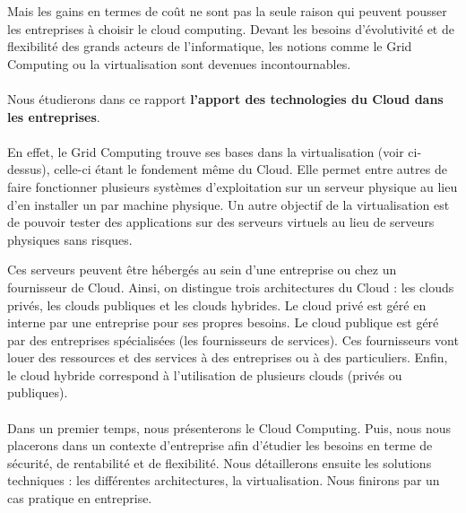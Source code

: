 \documentclass[a4paper,12pt]{report}
\begin{document}
\begin{onehalfspace}
	Mais les gains en termes de coût ne sont pas la seule raison qui peuvent pousser les entreprises à choisir le cloud computing. Devant les besoins d'évolutivité et de flexibilité des grands acteurs de l'informatique, les notions comme le Grid Computing ou la virtualisation sont devenues incontournables.
	
	
	\paragraph*{}
	Nous étudierons dans ce rapport \textbf{l’apport des technologies du Cloud dans les entreprises}.
	
	\paragraph*{}
	En effet, le Grid Computing trouve ses bases dans la virtualisation (voir ci-dessus), celle-ci étant  le fondement même du Cloud. Elle permet entre autres de faire fonctionner plusieurs systèmes d’exploitation sur un serveur physique au lieu d’en installer un par machine physique. Un autre objectif de la virtualisation est de pouvoir tester des applications sur des serveurs virtuels au lieu de serveurs physiques sans risques.
	
	Ces serveurs peuvent être hébergés au sein d’une entreprise ou chez un fournisseur de Cloud. Ainsi, on distingue trois architectures du Cloud : les clouds privés, les clouds publiques et les clouds hybrides. Le cloud privé est géré en interne par une entreprise pour ses propres besoins. Le cloud publique est géré par des entreprises spécialisées (les fournisseurs de services). Ces fournisseurs vont louer des ressources et des services à des entreprises ou à des particuliers. Enfin, le cloud hybride correspond à l’utilisation de plusieurs clouds (privés ou publiques).
	
	\paragraph*{}
	Dans un premier temps, nous présenterons le Cloud Computing. Puis, nous nous placerons dans un contexte d’entreprise afin d’étudier les besoins en terme de sécurité, de rentabilité et de flexibilité. Nous détaillerons ensuite les solutions techniques : les différentes architectures, la virtualisation. Nous finirons par un cas pratique en entreprise.
	
	
	

\end{onehalfspace}
\end{document}
